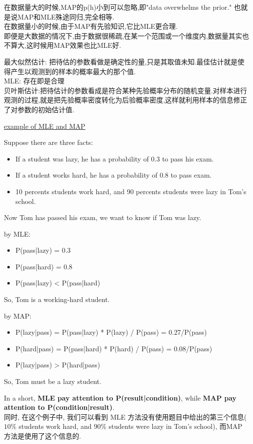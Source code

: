 \documentclass{article}
\begin{document}
在数据量大的时候,MAP的p(h)小到可以忽略,即"data overwhelms the prior." 也就是说MAP和MLE殊途同归,完全相等.\\
在数据量小的时候,由于MAP有先验知识,它比MLE更合理.\\
即便是大数据的情况下,由于数据很稀疏,在某一个范围或一个维度内,数据量其实也不算大,这时候用MAP效果也比MLE好.

\noindent
最大似然估计:
把待估的参数看做是确定性的量,只是其取值未知.最佳估计就是使得产生以观测到的样本的概率最大的那个值.\\
MLE: 存在即是合理\\
贝叶斯估计:把待估计的参数看成是符合某种先验概率分布的随机变量.对样本进行观测的过程,就是把先验概率密度转化为后验概率密度,这样就利用样本的信息修正了对参数的初始估计值.

\begin{example}
\href{http://jimbozhang.blogspot.com/2008/12/difference-between-map-and-mle.html}{example of MLE and MAP}

Suppose there are three facts:
\begin{itemize}
\item If a student was lazy, he has a probability of 0.3 to pass his exam.
\item If a student works hard, he has a probability of 0.8 to pass exam.
\item 10 percents students work hard, and 90 percents students were lazy in Tom's school.
\end{itemize}
Now Tom has passed his exam, we want to know if Tom was lazy.

by MLE:
\begin{itemize}
\item P(pass|lazy) = 0.3
\item P(pass|hard) = 0.8
\item P(pass|lazy) < P(pass|hard)
\end{itemize}
So, Tom is a working-hard student.

by MAP:
\begin{itemize}
\item P(lazy|pass) = P(pass|lazy) * P(lazy) / P(pass) = 0.27/P(pass) 
\item P(hard|pass) = P(pass|hard) * P(hard) / P(pass) = 0.08/P(pass)
\item P(lazy|pass) > P(hard|pass)
\end{itemize}
So, Tom must be a lazy student.

In a short, \textbf{MLE pay attention to P(result|condition)}, while \textbf{MAP pay attention to P(condition|result)}.\\
同时, 在这个例子中, 我们可以看到 
MLE 方法没有使用题目中给出的第三个信息($10\%$ students work hard, and $90\%$ students were lazy in Tom's school), 
而MAP 方法是使用了这个信息的.
\end{example}
\end{document}
